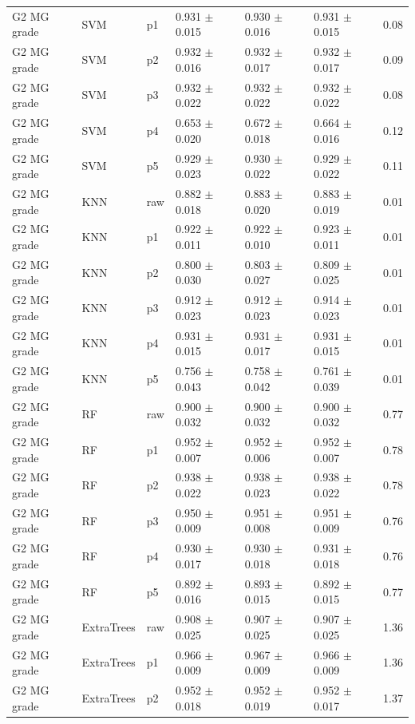 {\begin{longtable}{L{2.35cm}L{2.4cm}L{1.0cm}L{2.35cm}L{2.25cm}L{2.25cm}L{1.45cm}}
G2 MG grade & SVM & p1 & 0.931 $\pm$ 0.015 & 0.930 $\pm$ 0.016 & 0.931 $\pm$ 0.015 & 0.08 \\
G2 MG grade & SVM & p2 & 0.932 $\pm$ 0.016 & 0.932 $\pm$ 0.017 & 0.932 $\pm$ 0.017 & 0.09 \\
G2 MG grade & SVM & p3 & 0.932 $\pm$ 0.022 & 0.932 $\pm$ 0.022 & 0.932 $\pm$ 0.022 & 0.08 \\
G2 MG grade & SVM & p4 & 0.653 $\pm$ 0.020 & 0.672 $\pm$ 0.018 & 0.664 $\pm$ 0.016 & 0.12 \\
G2 MG grade & SVM & p5 & 0.929 $\pm$ 0.023 & 0.930 $\pm$ 0.022 & 0.929 $\pm$ 0.022 & 0.11 \\
G2 MG grade & KNN & raw & 0.882 $\pm$ 0.018 & 0.883 $\pm$ 0.020 & 0.883 $\pm$ 0.019 & 0.01 \\
G2 MG grade & KNN & p1 & 0.922 $\pm$ 0.011 & 0.922 $\pm$ 0.010 & 0.923 $\pm$ 0.011 & 0.01 \\
G2 MG grade & KNN & p2 & 0.800 $\pm$ 0.030 & 0.803 $\pm$ 0.027 & 0.809 $\pm$ 0.025 & 0.01 \\
G2 MG grade & KNN & p3 & 0.912 $\pm$ 0.023 & 0.912 $\pm$ 0.023 & 0.914 $\pm$ 0.023 & 0.01 \\
G2 MG grade & KNN & p4 & 0.931 $\pm$ 0.015 & 0.931 $\pm$ 0.017 & 0.931 $\pm$ 0.015 & 0.01 \\
G2 MG grade & KNN & p5 & 0.756 $\pm$ 0.043 & 0.758 $\pm$ 0.042 & 0.761 $\pm$ 0.039 & 0.01 \\
G2 MG grade & RF & raw & 0.900 $\pm$ 0.032 & 0.900 $\pm$ 0.032 & 0.900 $\pm$ 0.032 & 0.77 \\
G2 MG grade & RF & p1 & 0.952 $\pm$ 0.007 & 0.952 $\pm$ 0.006 & 0.952 $\pm$ 0.007 & 0.78 \\
G2 MG grade & RF & p2 & 0.938 $\pm$ 0.022 & 0.938 $\pm$ 0.023 & 0.938 $\pm$ 0.022 & 0.78 \\
G2 MG grade & RF & p3 & 0.950 $\pm$ 0.009 & 0.951 $\pm$ 0.008 & 0.951 $\pm$ 0.009 & 0.76 \\
G2 MG grade & RF & p4 & 0.930 $\pm$ 0.017 & 0.930 $\pm$ 0.018 & 0.931 $\pm$ 0.018 & 0.76 \\
G2 MG grade & RF & p5 & 0.892 $\pm$ 0.016 & 0.893 $\pm$ 0.015 & 0.892 $\pm$ 0.015 & 0.77 \\
G2 MG grade & ExtraTrees & raw & 0.908 $\pm$ 0.025 & 0.907 $\pm$ 0.025 & 0.907 $\pm$ 0.025 & 1.36 \\
G2 MG grade & ExtraTrees & p1 & 0.966 $\pm$ 0.009 & 0.967 $\pm$ 0.009 & 0.966 $\pm$ 0.009 & 1.36 \\
G2 MG grade & ExtraTrees & p2 & 0.952 $\pm$ 0.018 & 0.952 $\pm$ 0.019 & 0.952 $\pm$ 0.017 & 1.37 \\

\end{longtable}}

